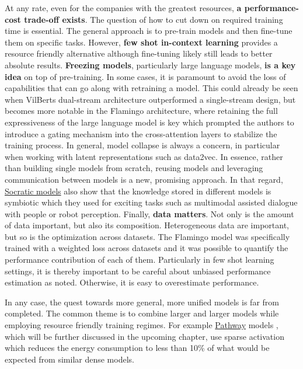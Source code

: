 \documentclass[
]{krantz}
\begin{document}
At any rate, even for the companies with the greatest resources, \textbf{a performance-cost trade-off exists}. The question of how to cut down on required training time is essential. The general approach is to pre-train models and then fine-tune them on specific tasks. However, \textbf{few shot in-context learning} provides a resource friendly alternative although fine-tuning likely still leads to better absolute results. \textbf{Freezing models}, particularly large language models, \textbf{is a key idea} on top of pre-training. In some cases, it is paramount to avoid the loss of capabilities that can go along with retraining a model. This could already be seen when VilBerts dual-stream architecture outperformed a single-stream design, but becomes more notable in the Flamingo architecture, where retaining the full expressiveness of the large language model is key which prompted the authors to introduce a gating mechanism into the cross-attention layers to stabilize the training process. In general, model collapse is always a concern, in particular when working with latent representations such as data2vec. In essence, rather than building single models from scratch, reusing models and leveraging communication between models is a new, promising approach. In that regard, \href{https://socraticmodels.github.io/}{Socratic models} \citep{zeng2022socratic} also show that the knowledge stored in different models is symbiotic which they used for exciting tasks such as multimodal assisted dialogue with people or robot perception. Finally, \textbf{data matters}. Not only is the amount of data important, but also its composition. Heterogeneous data are important, but so is the optimization across datasets. The Flamingo model was specifically trained with a weighted loss across datasets and it was possible to quantify the performance contribution of each of them. Particularly in few shot learning settings, it is thereby important to be careful about unbiased performance estimation as \citet{perez2021true} noted. Otherwise, it is easy to overestimate performance.

In any case, the quest towards more general, more unified models is far from completed. The common theme is to combine larger and larger models while employing resource friendly training regimes. For example \href{https://blog.google/technology/ai/introducing-pathways-next-generation-ai-architecture/}{Pathway} models \citep{chowdhery2022palm}, which will be further discussed in the upcoming chapter, use sparse activation which reduces the energy consumption to less than 10\% of what would be expected from similar dense models.
\end{document}
